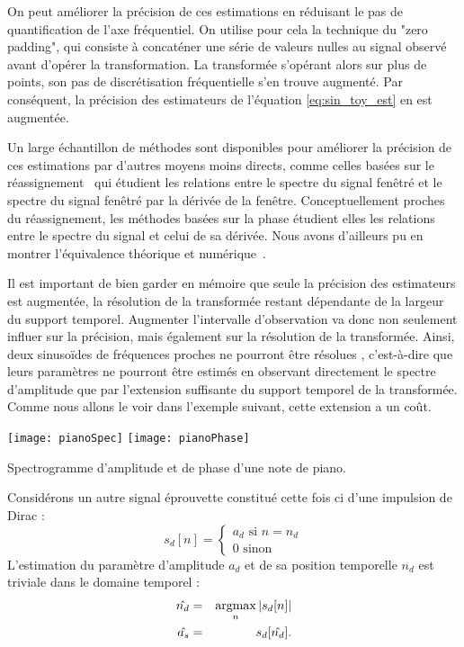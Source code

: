 On peut améliorer la précision de ces estimations en réduisant le pas de quantification de l'axe fréquentiel. On utilise pour cela la technique du "zero padding", qui consiste à concaténer une série de valeurs nulles au signal observé avant d'opérer la transformation. La transformée s'opérant alors sur plus de points, son pas de discrétisation fréquentielle s'en trouve augmenté. Par conséquent, la précision des estimateurs de l'équation \ref{eq:sin_toy_est} en est augmentée.

Un large échantillon de méthodes sont disponibles pour améliorer la précision de ces estimations par d'autres moyens moins directs, comme  celles basées sur le réassignement~\cite{auger1995improving} qui étudient les relations entre le spectre du signal fenêtré et le spectre du signal fenêtré par la dérivée de la fenêtre. Conceptuellement proches du réassignement, les méthodes basées sur la phase étudient elles les relations entre le spectre du signal et celui de sa dérivée. Nous avons d'ailleurs pu en montrer l'équivalence théorique et numérique~\cite{lagrangeJaes07}.

Il est important de bien garder en mémoire que seule la précision des estimateurs est augmentée, la résolution de la transformée restant dépendante de la largeur du support temporel.  Augmenter l'intervalle d'observation va donc non seulement influer sur la précision, mais également sur la résolution de la transformée. Ainsi, deux sinusoïdes de fréquences proches ne pourront être \og résolues \fg, c'est-à-dire que leurs paramètres ne pourront être estimés en observant directement le spectre d'amplitude que par l'extension suffisante du support temporel de la transformée. Comme nous allons le voir dans l'exemple suivant, cette extension a un coût.


\begin{marginfigure}
  \texttt{[image: pianoSpec]}
  \texttt{[image: pianoPhase]}
  \caption{Spectrogramme d'amplitude et de phase d'une note de piano.}
  \label{fig:phase}
\end{marginfigure}

Considérons un autre signal \og éprouvette \fg constitué cette fois ci d'une impulsion de Dirac :
\begin{equation}
  s_d[n] = \begin{cases}
    a_d \text{ si } n=n_d \\
    0 \text{ sinon}
\end{cases}
\end{equation}
L'estimation du paramètre d'amplitude $a_d$ et de sa position temporelle $n_d$ est triviale dans le domaine temporel :
\begin{eqnarray}
  \hat{n_d} &=&  \operatorname*{argmax}_n | s_d[n] | \\
  \hat{a_s} &=&  s_d[\hat{n_d}].
\end{eqnarray}

